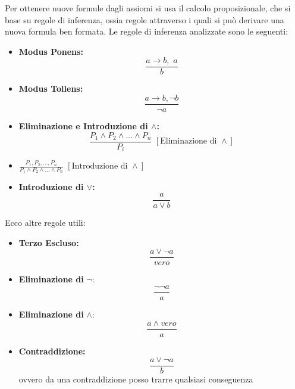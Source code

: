 \documentclass[a4paper]{report}
\begin{document}
Per ottenere nuove formule dagli assiomi si usa il calcolo proposizionale, che si base su regole di inferenza, ossia regole attraverso
i quali si può derivare una nuova formula ben formata.\newline
Le regole di inferenza analizzate sono le seguenti:
\begin{itemize}
\item \textbf{Modus Ponens:}
  \begin{equation*}
    \frac{a\to b,\,\,a}{b}
  \end{equation*}
\item \textbf{Modus Tollens:}
  \begin{equation*}
    \frac{a\to b, \neg b}{\neg a}
  \end{equation*}
\item \textbf{Eliminazione e Introduzione di $\land$:}
  \begin{equation*}
    \frac{P_1\land P_2 \land ... \land P_n}{P_i}\,\,[\mbox{Eliminazione di }\land]
  \end{equation*}
\item $\frac{P_1, P_2,...,P_n}{P_1\land P_2 \land ... \land P_n}\,\,[\mbox{Introduzione di }\land]$

\item \textbf{Introduzione di $\lor$:}
  \begin{equation*}
    \frac{a}{a \lor b}
  \end{equation*}
\end{itemize}
Ecco altre regole utili:
\begin{itemize}
\item \textbf{Terzo Escluso:}
  \begin{equation*}
    \frac{a \lor \neg a}{vero}
  \end{equation*}
  
\item \textbf{Eliminazione di} $\neg$:
  \begin{equation*}
    \frac{\neg \neg a}{a}
  \end{equation*}
  
\item \textbf{Eliminazione di} $\land$:
  \begin{equation*}
    \frac{a \land vero}{a}
  \end{equation*}
\item \textbf{Contraddizione:}
  \begin{equation*}
    \frac{a \lor \neg a}{b}
  \end{equation*}
ovvero da una contraddizione posso trarre qualsiasi conseguenza
\end{itemize}
\end{document}
